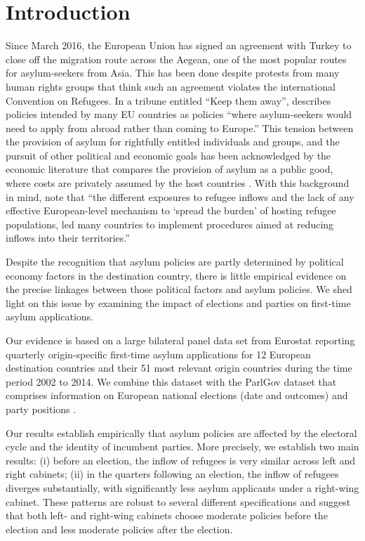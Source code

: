\documentclass[a4paper,12pt]{article}
\begin{document}
\section{Introduction}\label{Introduction}
Since March 2016, the European Union has signed an agreement with Turkey to close off the migration route across the Aegean, one of the most popular routes for asylum-seekers from Asia. This has been done despite protests from many human rights groups that think such an agreement violates the international Convention on Refugees. In a tribune entitled ``Keep them away'', \textit{\cite{Economist2017}} describes policies intended by many EU countries as policies ``where asylum-seekers would need to apply from abroad rather than coming to Europe.'' This tension between the provision of asylum for rightfully entitled individuals and groups, and the pursuit of other political and economic goals has been acknowledged by the economic literature that compares the provision of asylum as a public good, where costs are privately assumed by the host countries \citep{moraga2014}. With this background in mind, \cite{dustmann2016} note that ``the  different  exposures  to  refugee  inflows and  the  lack  of  any  effective  European-level  mechanism  to  `spread  the  burden'  of  hosting  refugee  populations,  led  many  countries  to  implement  procedures  aimed  at  reducing  inflows  into  their  territories.''

Despite the recognition that asylum policies are partly determined by political economy factors in the destination country, there is little empirical evidence on the precise linkages between those political factors and asylum policies. We shed light on this issue by examining the impact of elections and parties on first-time asylum applications.

Our evidence is based on a large bilateral panel data set from Eurostat reporting quarterly origin-specific first-time asylum applications for 12 European destination countries and their 51 most relevant origin countries during the time period 2002 to 2014. We combine this dataset with the ParlGov dataset that comprises information on European national elections (date and outcomes) and party positions \citep{parlgov2016}.

Our results establish empirically that asylum policies are affected by the electoral cycle and the identity of incumbent parties. More precisely, we establish two main results:
(i) before an election, the inflow of refugees is very similar across left and right cabinets; 
(ii)  in the quarters following an election, the inflow of refugees diverges substantially, with significantly less asylum applicants under a right-wing cabinet. These patterns are robust to several different specifications and suggest that both left- and right-wing cabinets choose moderate policies before the election and less moderate policies after the election.
\end{document}
